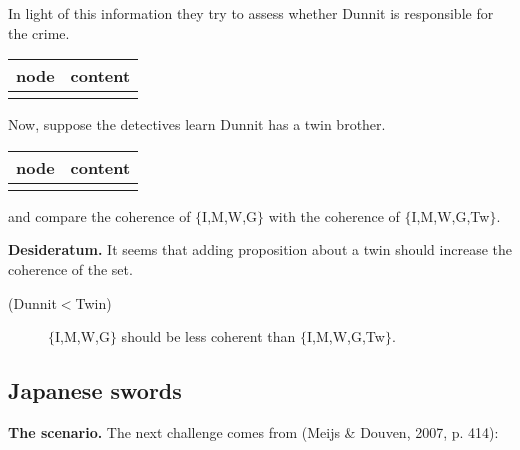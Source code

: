 \documentclass[10pt,]{scrartcl}
\newcommand{\s}[1]{\mbox{\textsf{#1}}}
\begin{document}
In light of this information they try to assess whether Dunnit is
responsible for the crime.

\begin{table}[H]
\centering
\begin{tabular}{l>{\raggedright\arraybackslash}p{25em}}
\toprule
node & content\\
\midrule
\cellcolor{gray!6}{G} & \cellcolor{gray!6}{Dunnit is guilty.}\\
\bottomrule
\end{tabular}
\end{table}

Now, suppose the detectives learn Dunnit has a twin brother.

\begin{table}[H]
\centering
\begin{tabular}{l>{\raggedright\arraybackslash}p{25em}}
\toprule
node & content\\
\midrule
\cellcolor{gray!6}{Tw} & \cellcolor{gray!6}{Dunnit has an identical twin which was seen by the credible witness two hundred miles from the scene of the crime during the murder.}\\
\bottomrule
\end{tabular}
\end{table}

\noindent and compare the coherence of \(\{\)\s{I,M,W,G}\(\}\) with the
coherence of \(\{\)\s{I,M,W,G,Tw}\(\}\).

\noindent \textbf{Desideratum.} It seems that adding proposition about a
twin should increase the coherence of the set.

\vspace{2mm}

\begin{description}
    \item[(Dunnit$<$Twin)] $\{$\s{I,M,W,G}$\}$ should be less coherent than $\{$\s{I,M,W,G,Tw}$\}$. 
\end{description}

\vspace{2mm}

\subsection{Japanese  swords}

\textbf{The scenario.} The next challenge comes from (Meijs \& Douven,
2007, p. 414):
\end{document}
